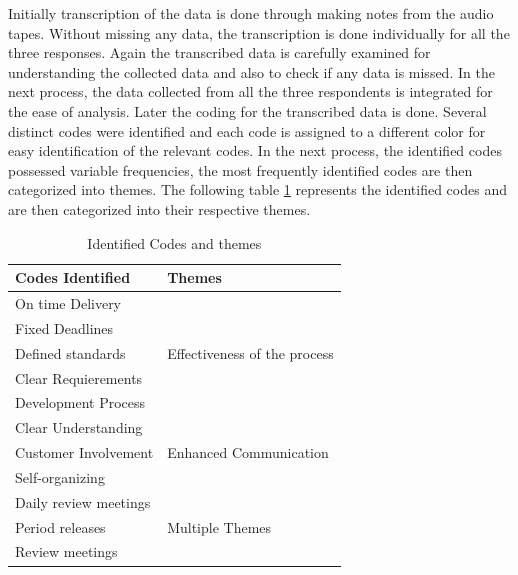 \documentclass[a4paper,oneside]{bth}
\begin{document}
Initially transcription of the data is done through making notes from the audio tapes. Without missing any data, the transcription is done individually for all the three responses. Again the transcribed data is carefully examined for understanding the collected data and also to check if any data is missed. In the next process, the data collected from all the three respondents is integrated for the ease of analysis. Later the coding for the transcribed data is done. Several distinct codes were identified and each code is assigned to a different color for easy identification of the relevant codes. In the next process, the identified codes possessed variable frequencies, the most frequently identified codes are then categorized into themes. The following table \ref{codes} represents the identified codes and are then categorized into their respective themes.
\begin{table}[h]
\centering
\caption{Identified Codes and themes}
\label{codes}
\begin{tabular}{|l|l|}
\hline
\textbf{Codes Identified} & \textbf{Themes}                               \\ \hline
On time Delivery          & \multirow{5}{*}{Effectiveness of the process} \\ \cline{1-1}
Fixed Deadlines           &                                               \\ \cline{1-1}
Defined standards         &                                               \\ \cline{1-1}
Clear Requierements       &                                               \\ \cline{1-1}
Development Process       &                                               \\ \hline
Clear Understanding       & \multirow{3}{*}{Enhanced Communication}       \\ \cline{1-1}
Customer Involvement      &                                               \\ \cline{1-1}
Self-organizing           &                                               \\ \hline
Daily review meetings     & \multirow{3}{*}{Multiple Themes}              \\ \cline{1-1}
Period releases           &                                               \\ \cline{1-1}
Review meetings           &                                               \\ \hline
\end{tabular}
\end{table}
\end{document}
